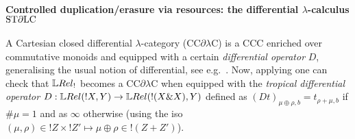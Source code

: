 \paragraph*{Controlled duplication/erasure via resources: the differential $\lambda$-calculus $\mathrm{ST}\partial\mathrm{LC}$}\label{sec:STDLC}

A Cartesian closed differential $\lambda$-category (CC$\partial\lambda$C)\cite{Manzo2010,Blute2009, Blute2019} is a CCC enriched over commutative monoids %
and equipped with a certain \emph{differential operator} $D$, generalising the usual notion of differential, see e.g.\ \cite{BluteEhrhTass10}.
Now, applying \cite[Theorem 6.1]{lemay2020} one can check that
 $\LREL_!$ becomes a CC$\partial\lambda$C when equipped with the \emph{tropical differential operator} $D:\HOM{\LREL}{!X}{Y}\to \HOM{\LREL}{!(X\& X)}{Y}$ defined as $(Dt)_{\mu\oplus\rho,b}=t_{\rho+\mu,b}$ if $\#\mu=1$ and as $\infty$ otherwise (using the iso $(\mu,\rho)\in !Z\times !Z'\mapsto\mu\oplus\rho \in !(Z+Z')$).

